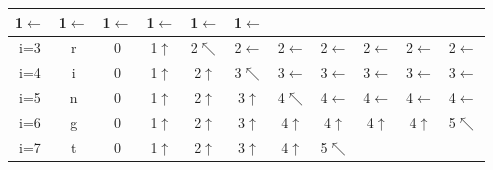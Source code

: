 \documentclass{article}
\begin{document}
\begin{multicols*}{2}
\begin{tabular}{|c|c|c|c|c|c|c|c|c|c|c|}
        1$\leftarrow$                  & 1$\leftarrow$
                                       & 1$\leftarrow$                 &
        1$\leftarrow$                  &
        1$\leftarrow$                  &
        1$\leftarrow$                                                            \\
        \hline
        i=3                            & r                             & 0   &
        1$\uparrow$                    &
        \cellcolor{red!25} 2$\nwarrow$ &
        2$\leftarrow$                  &
        2$\leftarrow$                  &
        2$\leftarrow$                  & 2$\leftarrow$
                                       & 2$\leftarrow$                 &
        2$\leftarrow$                                                            \\
        \hline
        i=4                            & i                             & 0   &
        1$\uparrow$                    &
        2$\uparrow$                    &
        \cellcolor{red!25}3$\nwarrow$  &
        3$\leftarrow$                  &
        3$\leftarrow$                  &
        3$\leftarrow$                  &
        3$\leftarrow$                  &
        3$\leftarrow$                                                            \\
        \hline
        i=5                            & n                             & 0   &
        1$\uparrow$                    &
        2$\uparrow$                    &
        3$\uparrow$                    &
        \cellcolor{red!25}4$\nwarrow$  &
        4$\leftarrow$                  &
        4$\leftarrow$                  &
        4$\leftarrow$                  &
        4$\leftarrow$                                                            \\
        \hline
        i=6                            & g                             & 0   &
        1$\uparrow$                    &
        2$\uparrow$                    &
        3$\uparrow$                    & 4$\uparrow$
                                       & 4$\uparrow$                   &
        4$\uparrow$                    &
        4$\uparrow$                    &
        5$\nwarrow$                                                              \\
        \hline
        i=7                            & t                             & 0   &
        1$\uparrow$                    &
        2$\uparrow$                    &
        3$\uparrow$                    & 4$\uparrow$
                                       & \cellcolor{red!25}5$\nwarrow$ &

\end{tabular}
\end{multicols*}
\end{document}
